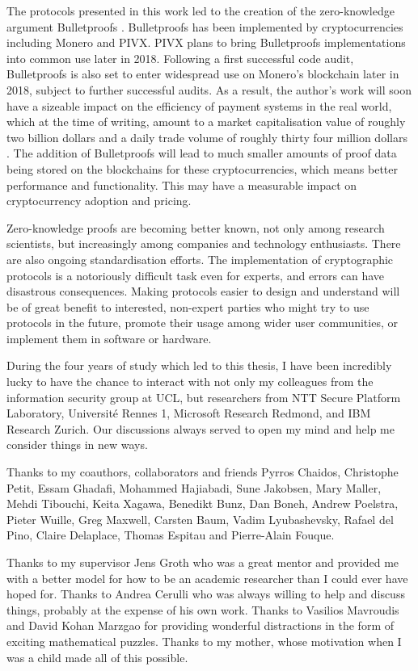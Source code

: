 The protocols presented in this work led to the creation of the zero-knowledge argument Bulletproofs \cite{BunzBBPWM18}. Bulletproofs has been implemented by cryptocurrencies including Monero and PIVX. PIVX plans to bring Bulletproofs implementations into common use later in 2018. Following a first successful code audit, Bulletproofs is also set to enter widespread use on Monero's blockchain later in 2018, subject to further successful audits. As a result, the author's work will soon have a sizeable impact on the efficiency of payment systems in the real world, which at the time of writing, amount to a market capitalisation value of roughly two billion dollars and a daily trade volume of roughly thirty four million dollars \footnotemark[1]. The addition of Bulletproofs will lead to much smaller amounts of proof data being stored on the blockchains for these cryptocurrencies, which means better performance and functionality. This may have a measurable impact on cryptocurrency adoption and pricing.

Zero-knowledge proofs are becoming better known, not only among research scientists, but increasingly among companies and technology enthusiasts. There are also ongoing standardisation efforts. The implementation of cryptographic protocols is a notoriously difficult task even for experts, and errors can have disastrous consequences. Making protocols easier to design and understand will be of great benefit to interested, non-expert parties who might try to use protocols in the future, promote their usage among wider user communities, or implement them in software or hardware.


\begin{acknowledgements}
During the four years of study which led to this thesis, I have been incredibly lucky to have the chance to interact with not only my colleagues from the information security group at UCL, but researchers from NTT Secure Platform Laboratory, Universit\'{e} Rennes 1, Microsoft Research Redmond, and IBM Research Zurich. Our discussions always served to open my mind and help me consider things in new ways.

Thanks to my coauthors, collaborators and friends Pyrros Chaidos, Christophe Petit, Essam Ghadafi, Mohammed Hajiabadi, Sune Jakobsen, Mary Maller, Mehdi Tibouchi, Keita Xagawa, Benedikt Bunz, Dan Boneh, Andrew Poelstra, Pieter Wuille, Greg Maxwell, Carsten Baum, Vadim Lyubashevsky, Rafael del Pino, Claire Delaplace, Thomas Espitau and Pierre-Alain Fouque.

Thanks to my supervisor Jens Groth who was a great mentor and provided me with a better model for how to be an academic researcher than I could ever have hoped for. Thanks to Andrea Cerulli who was always willing to help and discuss things, probably at the expense of his own work. Thanks to Vasilios Mavroudis and David Kohan Marzgao for providing wonderful distractions in the form of exciting mathematical puzzles. Thanks to my mother, whose motivation when I was a child made all of this possible.
\end{acknowledgements}

\setcounter{tocdepth}{2} 

\tableofcontents
\listoffigures
\listoftables

